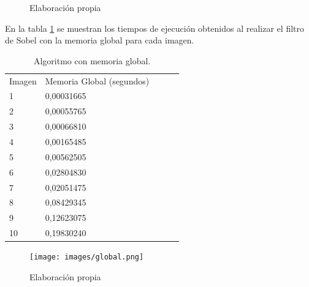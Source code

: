\documentclass[10pt,journal,compsoc]{IEEEtran}
\begin{document}
\begin{figure}[ht]
\centering
    \hspace{0.1cm}
    \hspace{0.1cm}
\caption{Elaboración propia}\label{fig:cats}
\end{figure}


En la tabla \ref{tab:global}  se muestran los tiempos de ejecución obtenidos al realizar el filtro de Sobel con la memoria global para cada imagen. 

\begin{table}[ht]
\centering
\caption{Algoritmo con memoria global.}
\label{tab:global}
\begin{tabular}{lllll}
Imagen & Memoria Global (segundos) &  &  &  \\
1      & 0,00031665                &  &  &  \\
2      & 0,00055765                &  &  &  \\
3      & 0,00066810                &  &  &  \\
4      & 0,00165485                &  &  &  \\
5      & 0,00562505                &  &  &  \\
6      & 0,02804830                &  &  &  \\
7      & 0,02051475                &  &  &  \\
8      & 0,08429345                &  &  &  \\
9      & 0,12623075                &  &  &  \\
10     & 0,19830240                &  &  & 
\end{tabular}
\end{table}

\begin{figure}[ht]
    \begin{center}
        \texttt{[image: images/global.png]}
    \end{center}
    \caption{Elaboración propia}
\end{figure}
\end{document}
